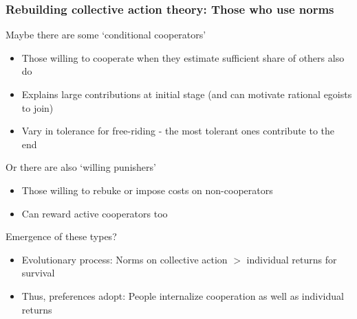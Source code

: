 \documentclass[aspectratio=169]{beamer}
\begin{document}
\begin{frame}
\frametitle{Rebuilding collective action theory: Those who use norms}
Maybe there are some `conditional cooperators'
\begin{itemize}\setlength\itemsep{3pt}
  \item Those willing to cooperate when they estimate sufficient share of others also do
  \item Explains large contributions at initial stage (and can motivate rational egoists to join)
  \item Vary in tolerance for free-riding - the most tolerant ones contribute to the end
\end{itemize} \medskip
Or there are also `willing punishers'
\begin{itemize}\setlength\itemsep{3pt}
  \item Those willing to rebuke or impose costs on non-cooperators 
  \item Can reward active cooperators too
\end{itemize} \medskip
Emergence of these types?
\begin{itemize}\setlength\itemsep{3pt}
  \item Evolutionary process: Norms on collective action $>$ individual returns for survival 
  \item Thus, preferences adopt: People internalize cooperation as well as individual returns
\end{itemize} \medskip
\end{frame}
\end{document}
